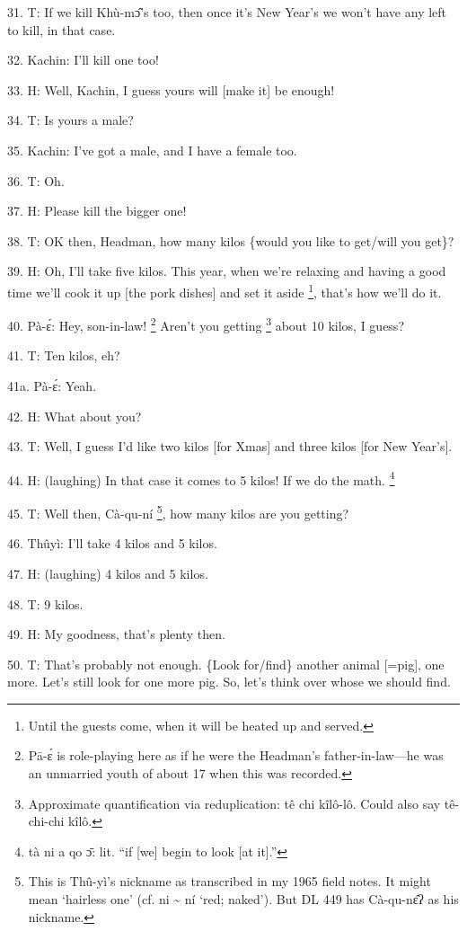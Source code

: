 31. T: If we kill Khù-mɔ̂'s too, then once it's New Year's we won't have any
left to kill, in that case.

32. Kachin: I'll kill one too!

33. H: Well, Kachin, I guess yours will [make it] be enough!

34. T: Is yours a male?

35. Kachin: I've got a male, and I have a female too.

36. T: Oh.

37. H: Please kill the bigger one!

38. T: OK then, Headman, how many kilos \{would you like to get/will you get\}?

39. H: Oh, I'll take five kilos.  This year, when we're relaxing and having a good
time we'll cook it up [the pork dishes] and set it aside \footnote{Until the guests come, when it will be heated up and served.}, that's how we'll
do it.

40. Pà-ɛ́: Hey, son-in-law! \footnote{Pā-ɛ́ is role-playing here as if he were the Headman's father-in-law---he was an unmarried youth of about 17 when this was recorded.} Aren't you getting \footnote{Approximate quantification via reduplication: tê chi kîlô-lô.  Could also say tê-chi-chi kîlô.} about 10 kilos, I guess?

41. T: Ten kilos, eh?

41a. Pà-ɛ́: Yeah.

42. H: What about you?

43. T: Well, I guess I'd like two kilos [for Xmas] and three kilos [for New Year's].

44. H: (laughing) In that case it comes to 5 kilos!  If we do the math. \footnote{tà ni a qo ɔ̄: lit. ``if [we] begin to look [at it].''}

45. T: Well then, Cà-qu-ní \footnote{This is Thû-yì's nickname as transcribed in my 1965 field notes.  It might mean `hairless one' (cf. ni \textasciitilde{} ní `red; naked').  But DL 449 has Cà-qu-nɛ̂ʔ as his nickname.}, how many kilos are you getting?

46. Thûyì: I'll take 4 kilos and 5 kilos.

47. H: (laughing) 4 kilos and 5 kilos.

48. T: 9 kilos.

49. H: My goodness, that's plenty then.

50. T: That's probably not enough.  \{Look for/find\} another animal [=pig], one
more.  Let's still look for one more pig.  So, let's think over whose we should
find.

